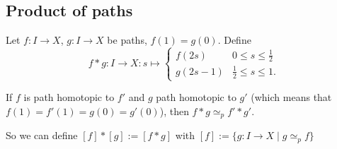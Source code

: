 \subsection*{Product of paths}
Let $f: I\to X$, $g: I \to X$ be paths, $f(1) = g(0)$.
Define  \[
    f*g: I \to X: s \mapsto \begin{cases}
        f(2s) & 0 \le  s \le  \frac{1}{2}\\
        g(2s - 1) & \frac{1}{2}\le s\le 1.
\end{cases}
\]
\begin{remark}
    If $f$ is path homotopic to $f'$ and $g$ path homotopic to $g'$ (which means that $f(1) = f'(1) = g(0) = g'(0)$), then $f * g \simeq_p f' * g'$.
\end{remark}

So we can define $[f] * [g] := [f*g]$ with $[f] := \{g : I \to  X  \mid g \simeq_p f\} $

